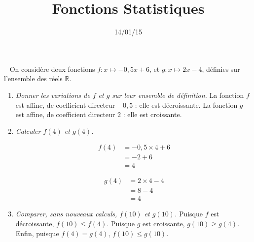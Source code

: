 \documentclass[12pt]{article}
\title{Fonctions Statistiques}
\date{14/01/15}
\begin{document}
\maketitle

\begin{exercice}~
  On considère deux fonctions $f:x\mapsto -0,5x+6$, et $g:x\mapsto 2x-4$,
  définies sur l'ensemble des réels $\mathbb{R}$.
  \begin{enumerate}
    \item \emph{Donner les variations de $f$ et $g$ sur leur ensemble de définition.} La fonction $f$ est affine, de coefficient directeur $-0,5$ : elle est décroissante. La fonction $g$ est affine, de coefficient directeur $2$ : elle est croissante.
    \item \emph{Calculer $f(4)$ et $g(4)$.}
      \begin{multicols}{2}
      \begin{align*}
        f(4) &= -0,5\times 4+6 \\
             &= -2 + 6 \\
             &= 4
      \end{align*}

      \begin{align*}
        g(4) &= 2\times 4-4 \\
             &= 8 -4 \\
             &= 4
      \end{align*}
    \end{multicols}
    \item \emph{Comparer, sans nouveaux calculs, $f(10)$ et $g(10)$.} Puisque $f$ est décroissante, $f(10)\leq f(4)$. Puisque $g$ est croissante, $g(10)\geq g(4)$. Enfin, puisque $f(4)=g(4)$, $f(10)\leq g(10)$.
  \end{enumerate}
\end{exercice}
\end{document}

